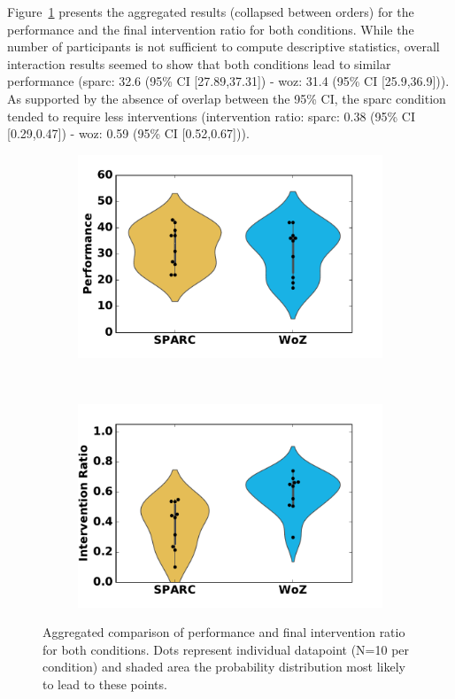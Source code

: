 Figure~\ref{fig:woz_comp} presents the aggregated results (collapsed between orders) for the performance and the final intervention ratio for both conditions. While the number of participants is not sufficient to compute descriptive statistics, overall interaction results seemed to show that both conditions lead to similar performance (\gls{sparc}: 32.6 (95\% CI [27.89,37.31]) - \gls{woz}: 31.4 (95\% CI [25.9,36.9])). As supported by the absence of overlap between the 95\% CI, the \gls{sparc} condition tended to require less interventions (intervention ratio: \gls{sparc}: 0.38 (95\% CI [0.29,0.47]) - \gls{woz}: 0.59 (95\% CI [0.52,0.67])). 

\begin{figure}[ht]
	\centering
	\begin{subfigure}[ht]{0.5\textwidth}
		\centering
		\includegraphics[width=1.0\textwidth]{perf.pdf}
	\end{subfigure}%
	~ 
	\begin{subfigure}[ht]{0.5\textwidth}
		\centering
		\includegraphics[width=1.0\textwidth]{ratio.pdf}
	\end{subfigure}
	\caption{Aggregated comparison of performance and final intervention ratio for both conditions. Dots represent individual datapoint (N=10 per condition) and shaded area the probability distribution most likely to lead to these points.}
	\label{fig:woz_comp}
\end{figure}

